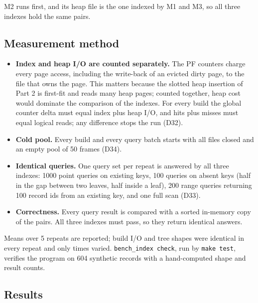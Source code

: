 \documentclass[11pt,a4paper]{article}
\begin{document}
M2 runs first, and its heap file is the one indexed by M1 and M3, so all three indexes hold the same pairs.

\subsection{Measurement method}

\begin{itemize}
\item \textbf{Index and heap I/O are counted separately.} The PF counters charge every page access, including the write-back of an evicted dirty page, to the file that owns the page. This matters because the slotted heap insertion of Part 2 is first-fit and reads many heap pages; counted together, heap cost would dominate the comparison of the indexes. For every build the global counter delta must equal index plus heap I/O, and hits plus misses must equal logical reads; any difference stops the run (D32).
\item \textbf{Cold pool.} Every build and every query batch starts with all files closed and an empty pool of 50 frames (D34).
\item \textbf{Identical queries.} One query set per repeat is answered by all three indexes: 1000 point queries on existing keys, 100 queries on absent keys (half in the gap between two leaves, half inside a leaf), 200 range queries returning 100 record ids from an existing key, and one full scan (D33).
\item \textbf{Correctness.} Every query result is compared with a sorted in-memory copy of the pairs. All three indexes must pass, so they return identical answers.
\end{itemize}

Means over 5 repeats are reported; build I/O and tree shapes were identical in every repeat and only times varied. \texttt{bench\_index check}, run by \texttt{make test}, verifies the program on 604 synthetic records with a hand-computed shape and result counts.

\subsection{Results}
\end{document}
